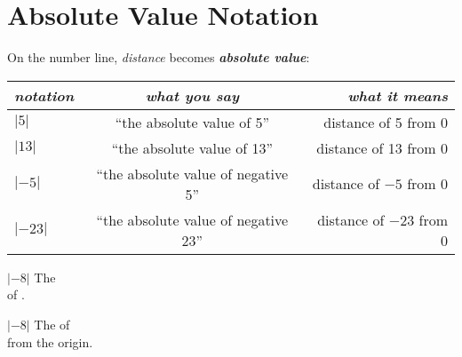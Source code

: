 
\section{Absolute Value Notation}

\begin{tcolorbox}[center,parbox=false,]
    On the number line, {\itshape distance} becomes {\bfseries\itshape absolute value}:\par
    \centering
    \renewcommand{\arraystretch}{1.5}
    \begin{tabular}{p{0.8in}cr}
        {\itshape notation} 
            & {\itshape what you {\bfseries\itshape say}}
            & {\itshape what it {\bfseries\itshape means}} \\
        \midrule
        $|5|$  
            & ``the absolute value of 5''
            &  distance of 5 from 0 \\
        $|13|$  
            & ``the absolute value of 13''
            &  distance of 13 from 0 \\
        $|-5|$  
            & ``the absolute value of {negative 5}''
            &  distance of $-5$ from 0 \\
        $|-23|$  
        & ``the absolute value of {negative 23}''
        &  distance of $-23$ from 0  \\
    \end{tabular}
\end{tcolorbox}



{
    $|-8|$
    \tcblower 
    The  \\[0.75\baselineskip]
    of  .
}


\vspace{1\baselineskip}


{
    $|-8|$
    \tcblower
    The  of \\[0.75\baselineskip]
    from the origin.
}
